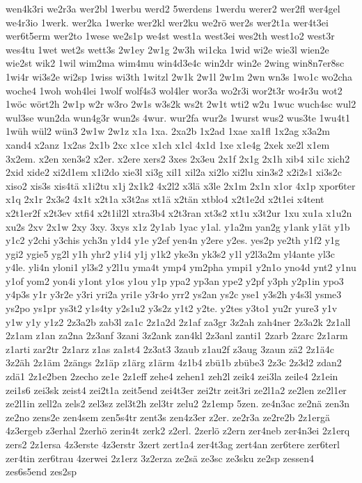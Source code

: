 {wen4k3ri
we2r3a
wer2bl
1werbu
werd2
5werdens
1werdu
werer2
wer2fl
wer4gel
we4r3io
1werk.
wer2ka
1werke
wer2kl
wer2ku
we2rö
wer2s
wer2t1a
wer4t3ei
wer6t5erm
wer2to
1wese
we2s1p
we4st
west1a
west3ei
wes2th
west1o2
west3r
wes4tu
1wet
wet2s
wett3s
2w1ey
2w1g
2w3h
wi1cka
1wid
wi2e
wie3l
wien2e
wie2st
wik2
1wil
wim2ma
wim4mu
win4d3e4c
win2dr
win2e
2wing
win8n7er8sc
1wi4r
wi3s2e
wi2sp
1wiss
wi3th
1witzl
2w1k
2w1l
2w1m
2wn
wn3s
1wo1c
wo2cha
woche4
1woh
woh4lei
1wolf
wolf4s3
wol4ler
wor3a
wo2r3i
wor2t3r
wo4r3u
wot2
1wöc
wört2h
2w1p
w2r
w3ro
2w1s
w3s2k
ws2t
2w1t
wti2
w2u
1wuc
wuch4sc
wul2
wul3se
wun2da
wun4g3r
wun2s
4wur.
wur2fa
wur2s
1wurst
wus2
wus3te
1wu4t1
1wüh
wül2
wün3
2w1w
2w1z
x1a
1xa.
2xa2b
1x2ad
1xae
xa1fl
1x2ag
x3a2m
xand4
x2anz
1x2as
2x1b
2xc
x1ce
x1ch
x1cl
4x1d
1xe
x1e4g
2xek
xe2l
x1em
3x2em.
x2en
xen3s2
x2er.
x2ere
xers2
3xes
2x3eu
2x1f
2x1g
2x1h
xib4
xi1c
xich2
2xid
xide2
xi2d1em
x1i2do
xie3l
xi3g
xil1
xil2a
xi2lo
xi2lu
xin3s2
x2i2s1
xi3s2c
xiso2
xis3s
xis4tä
x1i2tu
x1j
2x1k2
4x2l2
x3lä
x3le
2x1m
2x1n
x1or
4x1p
xpor6ter
x1q
2x1r
2x3s2
4x1t
x2t1a
x3t2as
xt1ä
x2tän
xtblo4
x2t1e2d
x2t1ei
x4tent
x2t1er2f
x2t3ev
xtfi4
x2t1il2l
xtra3b4
x2t3ran
xt3s2
xt1u
x3t2ur
1xu
xu1a
x1u2n
xu2s
2xv
2x1w
2xy
3xy.
3xys
x1z
2y1ab
1yac
y1al.
y1a2m
yan2g
y1ank
y1ät
y1b
y1c2
y2chi
y3chis
ych3n
y1d4
y1e
y2ef
yen4n
y2ere
y2es.
yes2p
ye2th
y1f2
y1g
ygi2
ygie5
yg2l
y1h
yhr2
y1i4
y1j
y1k2
yke3n
yk3s2
y1l
y2l3a2m
yl4ante
yl3c
y4le.
yli4n
yloni1
yl3s2
y2l1u
yma4t
ymp4
ym2pha
ympi1
y2n1o
yno4d
ynt2
y1nu
y1of
yom2
yon4i
y1ont
y1os
y1ou
y1p
ypa2
yp3an
ype2
y2pf
y3ph
y2p1in
ypo3
y4p3s
y1r
y3r2e
y3ri
yri2a
yri1e
y3r4o
yrr2
ys2an
ys2c
yse1
y3s2h
y4s3l
ysme3
ys2po
ys1pr
ys3t2
y1s4ty
y2s1u2
y3s2z
y1t2
y2te.
y2tes
y3to1
yu2r
yure3
y1v
y1w
y1y
y1z2
2z3a2b
zab3l
za1c
2z1a2d
2z1af
za3gr
3z2ah
zah4ner
2z3a2k
2z1all
2z1am
z1an
za2na
2z3anf
3zani
3z2ank
zan4kl
2z3anl
zanti1
2zarb
2zarc
2z1arm
z1arti
zar2tr
2z1arz
z1as
za1st4
2z3at3
3zaub
z1au2f
z3aug
3zaun
zä2
2z1ä4c
3z2äh
2z1äm
2zängs
2z1äp
z1ärg
z1ärm
4z1b4
zbü1b
zbübe3
2z3c
2z3d2
zdan2
zdä1
2z1e2ben
2zecho
ze1e
2z1eff
zehe4
zehen1
zeh2l
zeik4
zei3la
zeile4
2z1ein
zei1s6
zei3sk
zeist4
zei2t1a
zeit5end
zei4t3er
zei2tr
zeit3ri
ze2l1a2
ze2len
ze2l1er
ze2l1in
zell2a
zels2
zel3sz
zel3t2h
zel3tr
zelu2
2z1emp
5zen.
ze4n3ac
ze2nä
zen3n
ze2no
zens2e
zen4sem
zen5s4tr
zent3s
zen4z3er
z2er.
ze2r3a
ze2re2b
2z1ergä
4z3ergeb
z3erhal
2zerhö
zerin4t
zerk2
z2erl.
2zerlö
z2ern
zer4neb
zer4n3ei
2z1erq
zers2
2z1ersa
4z3erste
4z3erstr
3zert
zert1a4
zer4t3ag
zert4an
zer6tere
zer6terl
zer4tin
zer6trau
4zerwei
2z1erz
3z2erza
ze2sä
ze3sc
ze3sku
ze2sp
zessen4
zes6s5end
zes2sp
}
